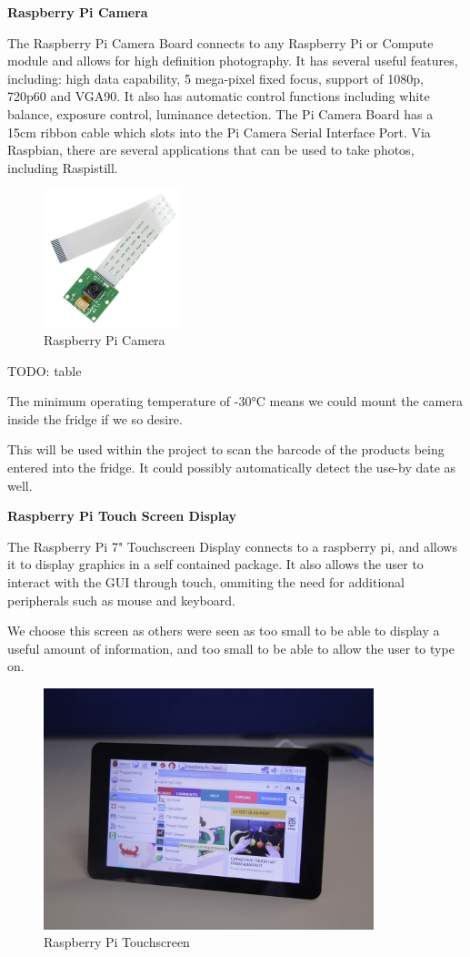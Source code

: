 \documentclass[10pt]{article}
\begin{document}
\textbf{Raspberry Pi Camera}

The Raspberry Pi Camera Board connects to any Raspberry Pi or Compute module and allows for high definition photography. It has several useful features, including: high data capability, 5 mega-pixel fixed focus, support of 1080p, 720p60 and VGA90. It also has automatic control functions including white balance, exposure control, luminance detection.
The Pi Camera Board has a 15cm ribbon cable which slots into the Pi Camera Serial Interface Port. Via Raspbian, there are several applications that can be used to take photos, including Raspistill.

\begin{figure}[h]
\centering
\caption{Raspberry Pi Camera}
\label{Raspberry Pi Camera}
\includegraphics[height=4cm]{images/pi-camera.jpg}
\end{figure}

TODO: table

The minimum operating temperature of -30°C means we could mount the camera inside the fridge if we so desire.

This will be used within the project to scan the barcode of the products being entered into the fridge. It could possibly automatically detect the use-by date as well.

\textbf{Raspberry Pi Touch Screen Display}

The Raspberry Pi 7" Touchscreen Display connects to a raspberry pi, and allows it to display graphics in a self contained package. It also allows the user to interact with the GUI through touch, ommiting the need for additional peripherals such as mouse and keyboard.

We choose this screen as others were seen as too small to be able to display a useful amount of information, and too small to be able to allow the user to type on.

\begin{figure}[h]
\centering
\caption{Raspberry Pi Touchscreen}
\label{Raspberry Pi Touchscreen}
\includegraphics[height=7cm]{images/pi-touchscreen.jpg}
\end{figure}
\end{document}
